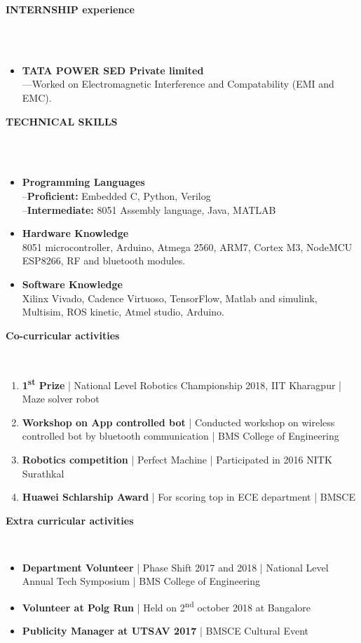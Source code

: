 \documentclass[a4paper,10pt]{article}
\newcommand{\lsep}{-0.5cm}
\newcommand{\resheading}[1]{{\small \colorbox{mygrey}{\begin{minipage}{0.975\textwidth}{\textbf{#1 \vphantom{p\^{E}}}}\end{minipage}}}}
\begin{document}
\resheading{\textbf{INTERNSHIP experience} }\\\\[\lsep]
\begin{itemize}
\item\noindent\textbf{TATA POWER SED Private limited}\\
\indent ---Worked on Electromagnetic Interference and Compatability (EMI and EMC).
\end{itemize}

\resheading{\textbf{TECHNICAL SKILLS} }\\\\[\lsep]
\begin{itemize}
\item \noindent \textbf{Programming Languages}\\
     --\textbf{Proficient:} Embedded C, Python, Verilog\\
     --\textbf{Intermediate:} 8051 Assembly language, Java, MATLAB\\
\item\noindent\textbf{Hardware Knowledge}\\
 8051 microcontroller, Arduino, Atmega 2560, ARM7, Cortex M3, NodeMCU ESP8266, RF and bluetooth modules.\\
\item\noindent\textbf{Software Knowledge}\\
Xilinx Vivado, Cadence Virtuoso, TensorFlow, Matlab and simulink, Multisim, ROS kinetic, Atmel studio, Arduino.
\end{itemize}



\resheading{\textbf{Co-curricular activities} }\\[\lsep]
\begin{enumerate}
\item\noindent \textbf{1\textsuperscript{st} Prize} | National Level Robotics Championship 2018, IIT Kharagpur | Maze solver robot
\item\noindent \textbf{Workshop on App controlled bot} | Conducted workshop on wireless controlled bot by bluetooth communication | BMS College of Engineering
\item\noindent\textbf{Robotics competition} | Perfect Machine | Participated in 2016 NITK Surathkal
\item\noindent\textbf{Huawei Schlarship Award} | For scoring top in ECE department | BMSCE
\end{enumerate}

\resheading{\textbf{Extra curricular activities} }\\[\lsep]
\begin{itemize}
\item \noindent \textbf{Department Volunteer} | Phase Shift 2017 and 2018 | National Level Annual Tech Symposium | BMS College of Engineering
\item \noindent \textbf{Volunteer at Polg Run} | Held on 2\textsuperscript{nd} october 2018 at Bangalore 
\item \noindent \textbf{Publicity Manager at UTSAV 2017} | BMSCE Cultural Event
\end{itemize}
\end{document}

